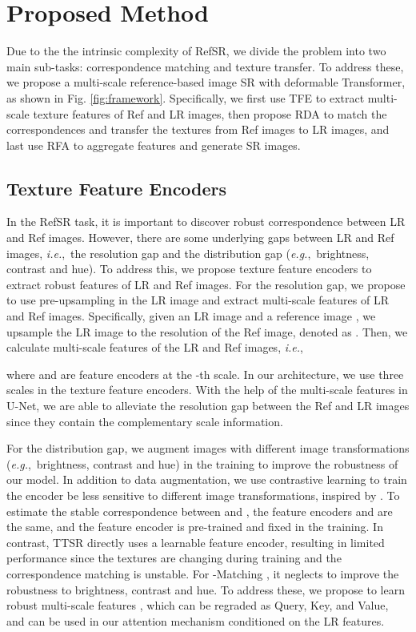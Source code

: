 \documentclass[runningheads]{llncs}
\def\ie{\mbox{\textit{i.e.}, }}
\def\eg{\mbox{\textit{e.g.}, }}
\begin{document}
\section{Proposed Method} 
Due to the the intrinsic complexity of RefSR, we divide the problem into two main sub-tasks: correspondence matching and texture transfer.
To address these, we propose a multi-scale reference-based image SR with deformable Transformer, as shown in Fig. \ref{fig:framework}.
Specifically, we first use TFE to extract multi-scale texture features of Ref and LR images, then propose RDA to match the correspondences and transfer the textures from Ref images to LR images, and last use RFA to aggregate features and generate SR images. 

\subsection{Texture Feature Encoders}
In the RefSR task, it is important to discover robust correspondence between LR and Ref images.
However, there are some underlying gaps between LR and Ref images, \ie the resolution gap and the distribution gap (\eg brightness, contrast and hue).
To address this, we propose texture feature encoders to extract robust features of LR and Ref images.
For the resolution gap, we propose to use pre-upsampling in the LR image and extract multi-scale features of LR and Ref images.
Specifically, given an LR image  and a reference image , we upsample the LR image to the resolution of the Ref image, denoted as . 
Then, we calculate multi-scale features of the LR and Ref images, \ie 

where  and  are feature encoders at the -th scale. 
In our architecture, we use three scales in the texture feature encoders.
With the help of the multi-scale features in U-Net, we are able to alleviate the resolution gap between the Ref and LR images since they contain the complementary scale information. 

For the distribution gap, we augment images with different image transformations (\eg brightness, contrast and hue) in the training to improve the robustness of our model.
In addition to data augmentation, we use contrastive learning to train the encoder be less sensitive to different image transformations, inspired by \cite{jiang2021robust}.
To estimate the stable correspondence between  and , the feature encoders  and  are the same, and the feature encoder  is pre-trained and fixed in the training.
In contrast, TTSR \cite{yang2020learning} directly uses a learnable feature encoder, resulting in limited performance since the textures are changing during training and the correspondence matching is unstable.
For -Matching \cite{jiang2021robust}, it neglects to improve the robustness to brightness, contrast and hue.
To address these, we propose to learn robust multi-scale features , which can be regraded as Query, Key, and Value, and can be used in our attention mechanism conditioned on the LR features. 
\end{document}
